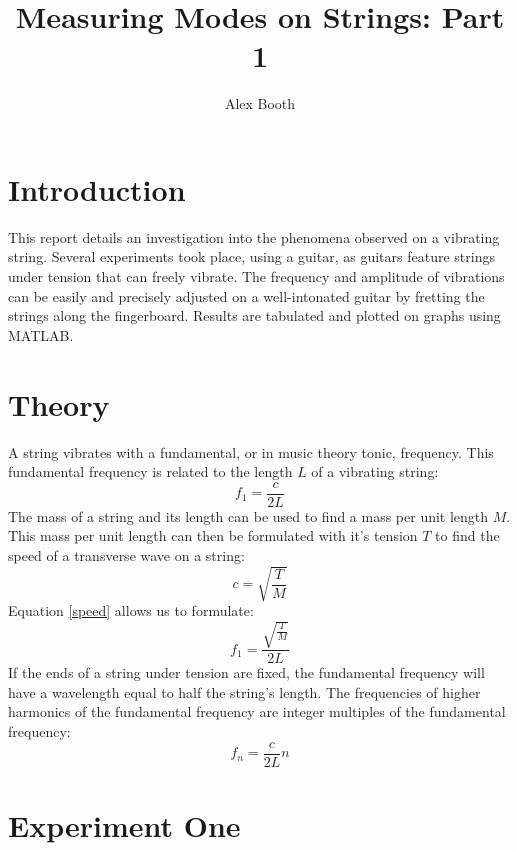 \documentclass[11pt]{article}
\title{Measuring Modes on Strings: Part 1}
\author{Alex Booth}
\begin{document}
    \maketitle

    \section{Introduction}
        This report details an investigation into the phenomena observed on a vibrating string.
        Several experiments took place, using a guitar, as guitars feature strings under tension that can freely vibrate.
        The frequency and amplitude of vibrations can be easily and precisely adjusted on a well-intonated guitar by fretting the strings along the fingerboard.
        Results are tabulated and plotted on graphs using MATLAB. 
    
    \section{Theory}
        A string vibrates with a fundamental, or in music theory tonic, frequency.
        This fundamental frequency is related to the length $L$ of a vibrating string:
        \begin{equation}
            f_1 = \frac{c}{2 L}
        \end{equation}
        The mass of a string and its length can be used to find a mass per unit length $M$.
        This mass per unit length can then be formulated with it's tension $T$ to find the speed of a transverse wave on a string:
        \begin{equation}\label{speed}
            c = \sqrt{\frac{T}{M}}
        \end{equation}
        Equation \ref{speed} allows us to formulate:
        \begin{equation}\label{fund}
            f_1 = \frac{\sqrt{\frac{T}{M}}}{2 L}
        \end{equation}
        If the ends of a string under tension are fixed, the fundamental frequency will have a wavelength equal to half the string's length.
        The frequencies of higher harmonics of the fundamental frequency are integer multiples of the fundamental frequency:
        \begin{equation}\label{harm}
            f_n = \frac{c}{2 L} n
        \end{equation}

    \section{Experiment One}
\end{document}
